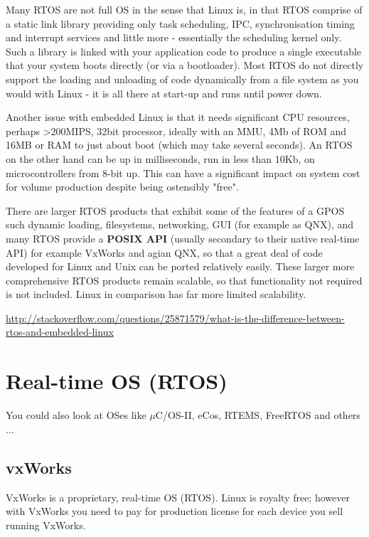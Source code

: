 Many RTOS are not full OS in the sense that Linux is, in that RTOS  comprise of
a static link library providing only task scheduling, IPC, synchronisation timing
and interrupt services and little more - essentially the scheduling kernel only.
Such a library is linked with your application code to produce a single
executable that your system boots directly (or via a bootloader).
Most RTOS do not directly support the loading and unloading of code dynamically
from a file system as you would with Linux - it is all there at start-up and runs until power down.

Another issue with embedded Linux is that it needs significant CPU resources,
perhaps >200MIPS, 32bit processor, ideally with an MMU, 4Mb of ROM and 16MB or
RAM to just about boot (which may take several seconds). An RTOS on the other
hand can be up in milliseconds, run in less than 10Kb, on microcontrollers from
8-bit up. This can have a significant impact on system cost for volume
production despite being ostensibly "free".


There are larger RTOS products that exhibit some of the features of a GPOS such
dynamic loading, filesystems, networking, GUI (for example as QNX), and many
RTOS provide a {\bf POSIX API} (usually secondary to their native real-time API)
for example VxWorks and agian QNX, so that a great deal of code developed for Linux
and Unix can be ported relatively easily. These larger more comprehensive RTOS
products remain scalable, so that functionality not required is not included.
Linux in comparison has far more limited scalability.

\url{http://stackoverflow.com/questions/25871579/what-is-the-difference-between-rtos-and-embedded-linux}

\section{Real-time OS (RTOS)}

You could also look at OSes like $\mu$C/OS-II, eCos, RTEMS, FreeRTOS and others
...

\subsection{vxWorks}
\label{sec:vxWorks}

VxWorks is a proprietary, real-time OS (RTOS). 
Linux is royalty free; however with VxWorks you need to pay for
production license for each device you sell running VxWorks.

